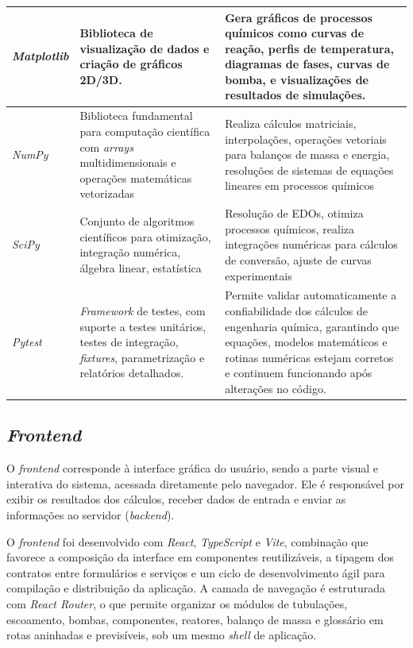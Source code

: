 \begin{longtable}{|>{\raggedright\arraybackslash}p{}|>{\raggedright\arraybackslash}p{}|>{\raggedright\arraybackslash}p{}|}
\textit{Matplotlib} & Biblioteca de visualização de dados e criação de gráficos 2D/3D. & Gera gráficos de processos químicos como curvas de reação, perfis de temperatura, diagramas de fases, curvas de bomba, e visualizações de resultados de simulações. \\ \hline
\textit{NumPy} & Biblioteca fundamental para computação científica com \textit{arrays} multidimensionais e operações matemáticas vetorizadas & Realiza cálculos matriciais, interpolações, operações vetoriais para balanços de massa e energia, resoluções de sistemas de equações lineares em processos químicos \\ \hline
\textit{SciPy} & Conjunto de algoritmos científicos para otimização, integração numérica, álgebra linear, estatística & Resolução de EDOs, otimiza processos químicos, realiza integrações numéricas para cálculos de conversão, ajuste de curvas experimentais \\ \hline
\textit{Pytest} & \textit{Framework} de testes, com suporte a testes unitários, testes de integração, \textit{fixtures}, parametrização e relatórios detalhados. & Permite validar automaticamente a confiabilidade dos cálculos de engenharia química, garantindo que equações, modelos matemáticos e rotinas numéricas estejam corretos e continuem funcionando após alterações no código. \\ \hline
\end{longtable}

\subsection{\textit{Frontend}}

O \textit{frontend} corresponde à interface gráfica do usuário, sendo a parte visual e interativa do sistema, acessada diretamente pelo navegador. Ele é responsável por exibir os resultados dos cálculos, receber dados de entrada e enviar as informações ao servidor (\textit{backend}).

O \textit{frontend} foi desenvolvido com \textit{React}, \textit{TypeScript} e \textit{Vite}, combinação que favorece a composição da interface em componentes reutilizáveis, a tipagem dos contratos entre formulários e serviços e um ciclo de desenvolvimento ágil para compilação e distribuição da aplicação. A camada de navegação é estruturada com \textit{React Router}, o que permite organizar os módulos de tubulações, escoamento, bombas, componentes, reatores, balanço de massa e glossário em rotas aninhadas e previsíveis, sob um mesmo \textit{shell} de aplicação.


